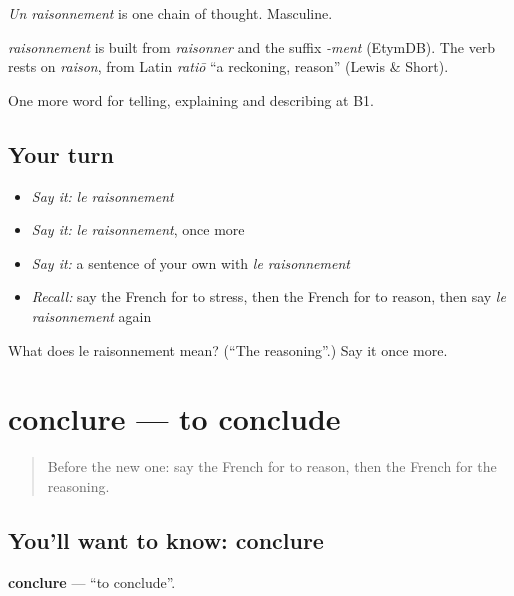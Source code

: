 \emph{Un raisonnement} is one chain of thought. Masculine.

\begin{cousinweb}
\emph{raisonnement} is built from \emph{raisonner} and the suffix \emph{-ment} (EtymDB). The verb rests on \emph{raison}, from Latin \emph{ratiō} \textquotedblleft{}a reckoning, reason\textquotedblright{} (Lewis \& Short).
\end{cousinweb}

\begin{grammarlens}[title={What you've built}]
One more word for telling, explaining and describing at B1.
\end{grammarlens}

\subsection*{Your turn}
\begin{itemize}
\raggedright
  \item \emph{Say it:} \emph{le raisonnement}
  \item \emph{Say it:} \emph{le raisonnement}, once more
  \item \emph{Say it:} a sentence of your own with \emph{le raisonnement}
  \item \emph{Recall:} say the French for to stress, then the French for to reason, then say \emph{le raisonnement} again
\end{itemize}

\begin{tcolorbox}[breakable,colback=teal!4,colframe=teal!35!black,title={Before you move on}]
What does le raisonnement mean? (\textquotedblleft{}The reasoning\textquotedblright{}.) Say it once more.
\end{tcolorbox}
\section[conclure]{conclure — to conclude}

\label{lesson:FR-C344-conclure}



\begin{quote}
Before the new one: say the French for to reason, then the French for the reasoning.
\end{quote}

\subsection*{You'll want to know: conclure}
\textbf{conclure} — \textquotedblleft{}to conclude\textquotedblright{}.

